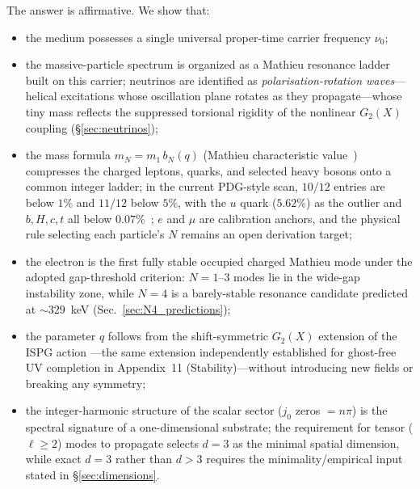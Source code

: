 \documentclass[11pt]{article}
\begin{document}
The answer is affirmative. We show that:
\begin{itemize}
  \item the medium possesses a single universal proper-time
    carrier frequency $\nu_0$;
  \item the massive-particle spectrum is organized as a
    Mathieu resonance ladder built on this carrier; neutrinos are identified as
    \emph{polarisation-rotation waves}---helical
    excitations whose oscillation plane rotates as
    they propagate---whose tiny mass reflects the
    suppressed torsional rigidity of the nonlinear
    $G_2(X)$ coupling (\S\ref{sec:neutrinos});
  \item the mass formula $m_N = m_1\,b_N(q)$ (Mathieu
    characteristic value~\cite{McLachlan1947,DLMFMathieu})
    compresses the charged leptons, quarks, and selected
    heavy bosons onto a common integer ladder; in the
    current PDG-style scan, $10/12$ entries are below
    $1\%$ and $11/12$ below $5\%$, with the $u$ quark
    ($5.62\%$) as the outlier and $b,H,c,t$ all below
    $0.07\%$~\cite{PDG2024}; $e$ and $\mu$ are calibration
    anchors, and the physical rule selecting each
    particle's $N$ remains an open derivation target;
  \item the electron is the first fully stable occupied charged
    Mathieu mode under the adopted gap-threshold criterion:
    $N=1$--$3$ modes lie in the wide-gap instability zone,
    while $N=4$ is a barely-stable resonance candidate
    predicted at $\sim 329$~keV (Sec.~\ref{sec:N4_predictions});
  \item the parameter $q$ follows from the shift-symmetric
    $G_2(X)$ extension of the ISPG action \cite{Nicolis2009,Deffayet2009}---the same
    extension independently established for ghost-free
    UV completion in Appendix~11 (Stability)---without
    introducing new fields or breaking any symmetry;
  \item the integer-harmonic structure of the scalar sector
    ($j_0$ zeros $= n\pi$) is the spectral signature of a
    one-dimensional substrate; the requirement for tensor
    ($\ell \geq 2$) modes to propagate selects $d=3$ as the
    minimal spatial dimension, while exact $d=3$ rather than
    $d>3$ requires the minimality/empirical input stated in
    \S\ref{sec:dimensions}.
\end{itemize}
\end{document}
